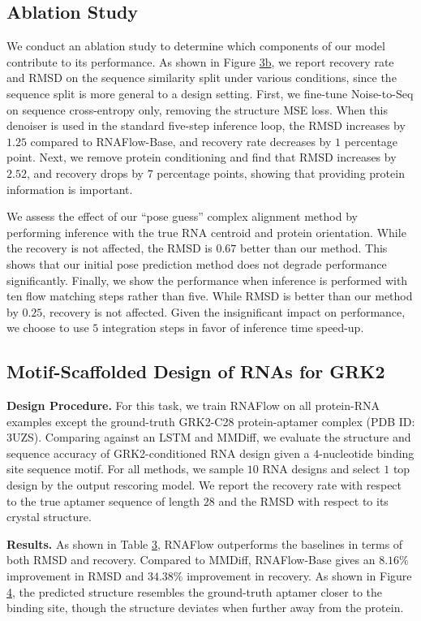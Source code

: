 \subsection{Ablation Study}
\label{sec:4.3}

We conduct an ablation study to determine which components of our model contribute to its performance. As shown in Figure \hyperref[fig:3]{3b}, we report recovery rate and RMSD on the sequence similarity split under various conditions, since the sequence split is more general to a design setting. First, we fine-tune Noise-to-Seq on sequence cross-entropy only, removing the structure MSE loss. When this denoiser is used in the standard five-step inference loop, the RMSD increases by $1.25$ compared to RNAFlow-Base, and recovery rate decreases by $1$ percentage point. Next, we remove protein conditioning and find that RMSD increases by $2.52$, and recovery drops by $7$ percentage points, showing that providing protein information is important.

We assess the effect of our ``pose guess'' complex alignment method by performing inference with the true RNA centroid and protein orientation. While the recovery is not affected, the RMSD is $0.67$ better than our method. This shows that our initial pose prediction method does not degrade performance significantly. Finally, we show the performance when inference is performed with ten flow matching steps rather than five. While RMSD is better than our method by $0.25$, recovery is not affected. Given the insignificant impact on performance, we choose to use $5$ integration steps in favor of inference time speed-up.

\subsection{Motif-Scaffolded Design of RNAs for GRK2}
\label{sec:4.4}

\textbf{Design Procedure.} For this task, we train RNAFlow on all protein-RNA examples except the ground-truth GRK2-C28 protein-aptamer complex (PDB ID: 3UZS). Comparing against an LSTM and MMDiff, we evaluate the structure and sequence accuracy of GRK2-conditioned RNA design given a $4$-nucleotide binding site sequence motif. For all methods, we sample $10$ RNA designs and select $1$ top design by the output rescoring model. We report the recovery rate with respect to the true aptamer sequence of length $28$ and the RMSD with respect to its crystal structure. 

\textbf{Results.} As shown in Table \hyperref[tab:3]{3}, RNAFlow outperforms the baselines in terms of both RMSD and recovery. Compared to MMDiff, RNAFlow-Base gives an $8.16\%$ improvement in RMSD and $34.38\%$ improvement in recovery. As shown in Figure \hyperref[fig:4]{4}, the predicted structure resembles the ground-truth aptamer closer to the binding site, though the structure deviates when further away from the protein. 

